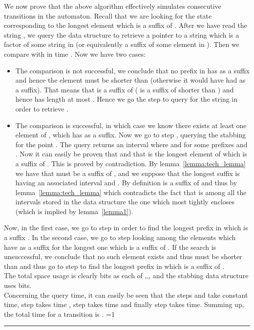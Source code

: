 \documentclass{article}
\newcommand{\?}{\mskip1.5mu}
\newcounter{noqed}
\newcommand{\qed}{ \ifmmode\mbox{
}\fi\rule[-.05em]{.3em}{.7em}\setcounter{noqed}{0}}
\newenvironment{proof}[1][{}]{\noindent{\bf Proof#1.
}\setcounter{noqed}{1}}{\ifnum\value{noqed}=1\qed\fi\par\medskip}
\begin{document}
\begin{proof} 
We now prove that the above algorithm effectively simulates  consecutive transitions in the automaton. Recall that we are looking for the state corresponding to the longest element  which is a suffix of . 
After we have read the string , we query the data structure  to retrieve a pointer  to a string  which is a factor of some string in  (or equivalently a suffix of some element in ). Then we compare  with  in time . Now we have two cases: 
\begin{itemize}
\item The comparison is not successful, we conclude that no prefix in  has  as a suffix and hence the element  must be shorter than  (otherwise it would have had  as a suffix). That means that  is a suffix of  ( is a suffix of  shorter than ) and hence has length at most . Hence we go the step  to query  for the string  in order to retrieve .
\item The comparison is successful, in which case we know there exists at least one element of , which has  as a suffix. Now we go to step  , querying the  stabbing for the point . The query returns an interval  where  and  for some prefixes  and . Now it can easily be proven that  and that  is the longest element of  which is a suffix of . This is proved by contradiction. By lemma~\ref{lemma:tech_lemma} we have that  must be a suffix of , and we suppose that the longest suffix is  having an associated interval  and . By definition  is a suffix of   and thus by lemma~\ref{lemma:tech_lemma}  which contradicts the fact that  is among all the intervals stored in the  data structure the one which most tightly encloses  (which is implied by lemma~\ref{lemma1}). 
\end{itemize}
Now, in the first case, we go to step  in order to find the longest prefix in  which is a suffix . In the second case, we go to step  looking among the elements which have  as a suffix for the longest one which is a suffix of . If the search is unsuccessful, we conclude that no such element  exists and thus  must be shorter than  and thus go to step  to find the longest prefix in  which is a suffix of . 
\\
The total space usage is clearly  bits as each of ,,, and the  stabbing data structure uses  bits. 
\\
Concerning the query time, it can easily be seen that the steps  and  take constant time, step  takes time , step  takes time  and finally step  takes  time. Summing up, the total time for a transition is .
\end{proof}
\end{document}

